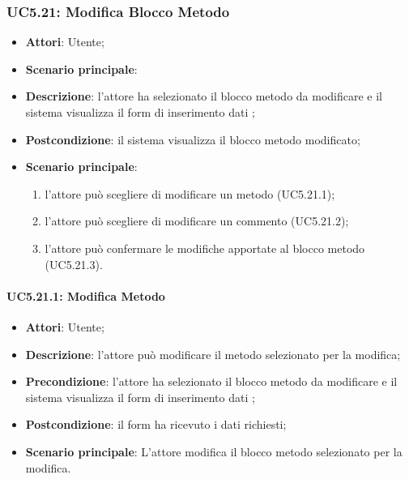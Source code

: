 \subsubsection{UC5.21: Modifica Blocco Metodo}
\label{UC5.21}
\begin{itemize}
	\item \textbf{Attori}: Utente;\item \textbf{Scenario principale}:

	\item \textbf{Descrizione}: l'attore ha selezionato il blocco metodo da modificare e il sistema visualizza il form di inserimento dati ;
	\item \textbf{Postcondizione}: il sistema visualizza il blocco metodo modificato;
	\item \textbf{Scenario principale}:
	\begin{enumerate}
		\item l'attore può scegliere di modificare un metodo (UC5.21.1);
		\item l'attore può scegliere di modificare un commento (UC5.21.2);
		\item l'attore può confermare le modifiche apportate al blocco metodo (UC5.21.3).
	\end{enumerate}
\end{itemize}

\paragraph{UC5.21.1: Modifica Metodo}
\label{UC5.21.1}
\begin{itemize}
	\item \textbf{Attori}: Utente;
	\item \textbf{Descrizione}: l'attore può modificare il metodo selezionato per la modifica;
	\item \textbf{Precondizione}: l'attore ha selezionato il blocco metodo da modificare e il sistema visualizza il form di inserimento dati ;
	\item \textbf{Postcondizione}: il form ha ricevuto i dati richiesti;
	\item \textbf{Scenario principale}: L'attore modifica il blocco metodo selezionato per la modifica.
\end{itemize}

